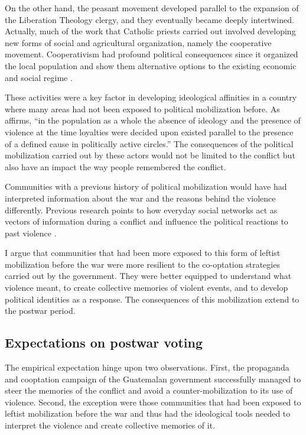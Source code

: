 \documentclass[12pt, notitlepage]{article}
\begin{document}
On the other hand, the peasant movement developed parallel to the expansion of the Liberation Theology clergy, and they eventually became deeply intertwined.
Actually, much of the work that Catholic priests carried out involved developing new forms of social and agricultural organization, namely the cooperative movement.
Cooperativism had profound political consequences since it organized the local population and show them alternative options to the existing economic and social regime \citep{Arias:1992aa, Nelson:2009aa, Bateson:2013aa}.

These activities were a key factor in developing ideological affinities in a country where many areas had not been exposed to political mobilization before.
As \citet[84]{Lofving:2005aa} affirms, ``in the population as a whole the absence of ideology and the presence of violence at the time loyalties were decided upon existed parallel to the presence of a defined cause in politically active circles.''
The consequences of the political mobilization carried out by these actors would not be limited to the conflict but also have an impact the way people remembered the conflict.

Communities with a previous history of political mobilization would have had interpreted information about the war and the reasons behind the violence differently.
Previous research points to how everyday social networks act as vectors of information during a conflict \citep{Shesterinina:2016aa} and influence the political reactions to past violence \citep{Rydgren:2007aa, Dorff:2017aa}.

I argue that communities that had been more exposed to this form of leftist mobilization before the war were more resilient to the co-optation strategies carried out by the government.
They were better equipped to understand what violence meant, to create collective memories of violent events, and to develop political identities as a response.
The consequences of this mobilization extend to the postwar period.

\subsection*{Expectations on postwar voting}

The empirical expectation hinge upon two observations.
First, the propaganda and cooptation campaign of the Guatemalan government successfully managed to steer the memories of the conflict and avoid a counter-mobilization to its use of violence.
Second, the exception were those communities that had been exposed to leftist mobilization before the war and thus had the ideological tools needed to interpret the violence and create collective memories of it.
\end{document}
